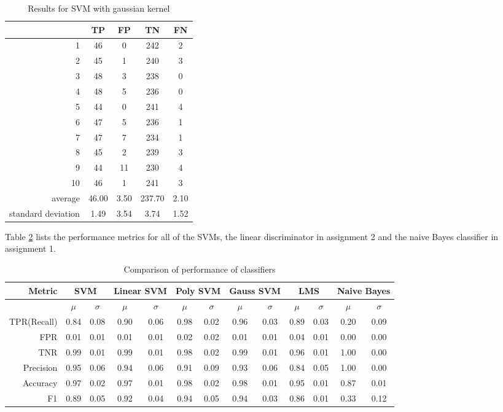 \documentclass[12pt]{article}
\begin{document}
  \begin{table}[H]
    \centering
    \caption{Results for SVM with gaussian kernel}
    \vspace{0.25cm}
    \label{tab:gaussSVM}
    \begin{tabular}{r|c|c|c|c}
      &TP&FP&TN&FN\\
      \hline
      1&46&0&242&2\\
      2&45&1&240&3\\
      3&48&3&238&0\\
      4&48&5&236&0\\
      5&44&0&241&4\\
      6&47&5&236&1\\
      7&47&7&234&1\\
      8&45&2&239&3\\
      9&44&11&230&4\\
      10&46&1&241&3\\
      \hline
      average&46.00&3.50&237.70&2.10\\
      standard deviation&1.49&3.54&3.74&1.52
    \end{tabular}
  \end{table}

  Table \ref{tab:metrics} lists the performance metrics for all of the SVMs, the linear discriminator in assignment 2 and the naive Bayes classifier in assignment 1.

  \begin{table}[H]
    \centering
    \label{tab:metrics}
    \caption{Comparison of performance of classifiers}
    \vspace{0.25cm}
    \small
    \begin{tabular}{r|cc|cc|cc|cc|cc|cc}
      Metric & \multicolumn{2}{|c}{SVM} & \multicolumn{2}{|c}{Linear SVM} & \multicolumn{2}{|c}{Poly SVM} & \multicolumn{2}{|c}{Gauss SVM} & \multicolumn{2}{|c}{LMS} & \multicolumn{2}{|c}{Naive Bayes} \\
      \hline
      & $\mu$ & $\sigma$ & $\mu$ & $\sigma$ & $\mu$ & $\sigma$ & $\mu$ & $\sigma$ & $\mu$ & $\sigma$ & $\mu$ & $\sigma$\\
      TPR(Recall)&0.84&0.08&0.90&0.06&0.98&0.02&0.96&0.03&0.89&0.03&0.20&0.09\\
      FPR&0.01&0.01&0.01&0.01&0.02&0.02&0.01&0.01&0.04&0.01&0.00&0.00\\
      TNR&0.99&0.01&0.99&0.01&0.98&0.02&0.99&0.01&0.96&0.01&1.00&0.00\\
      Precision&0.95&0.06&0.94&0.06&0.91&0.09&0.93&0.06&0.84&0.05&1.00&0.00\\
      Accuracy&0.97&0.02&0.97&0.01&0.98&0.02&0.98&0.01&0.95&0.01&0.87&0.01\\
      F1&0.89&0.05&0.92&0.04&0.94&0.05&0.94&0.03&0.86&0.01&0.33&0.12\\
    \end{tabular}
  \end{table}

  \printbibliography
\end{document}
